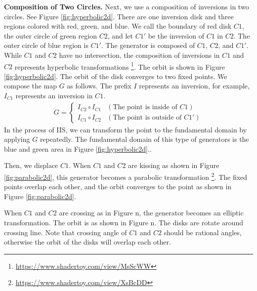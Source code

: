 \noindent\textbf{Composition of Two Circles.}
 Next, we use a composition of inversions in two circles.
 See Figure \ref{fig:hyperbolic2d}.
 There are one inversion disk and three regions colored with red, green,
 and blue.
 We call the boundary of red disk $C1$, 
 the outer circle of green region $C2$, and
 let $C1'$ be the inversion of $C1$ in $C2$.
 The outer circle of blue region is $C1'$.
 The generator is composed of $C1$, $C2$, and $C1'$.
 While $C1$ and $C2$ have no intersection, the composition of inversions
 in $C1$ and $C2$ represents hyperbolic transformations
 \footnote{\url{https://www.shadertoy.com/view/MsScWW}}.
 The orbit is shown in Figure
 \ref{fig:hyperbolic2d}.
 The orbit of the disk converges to two fixed points.
 We compose the map $G$ as follows.
 The prefix $I$ represents an inversion, for example, $I_{C1}$ represents
 an inversion in $C1$.
 \begin{align*}
  G =
  \begin{cases}
   I_{C2} \circ I_{C1} & (\text{The point is inside of } C1) \\
   I_{C1} \circ I_{C2} & (\text{The point is outside of }C1')
  \end{cases}
 \end{align*}
 In the process of IIS, we can transform the point to the fundamental
 domain by applying $G$ repeatedly.
 The fundamental domain of this type of generators is the blue and green
 area in Figure \ref{fig:hyperbolic2d}..

 Then, we displace $C1$.
 When $C1$ and $C2$ are kissing as shown in Figure 
 \ref{fig:parabolic2d},
 this generator becomes a parabolic transformation
 \footnote{\url{https://www.shadertoy.com/view/XsBcDD}}.
 The fixed points overlap each other, and the orbit converges to the
 point as shown in Figure \ref{fig:parabolic2d}.

 When $C1$ and $C2$ are crossing as in Figure n, 
 the generator becomes an elliptic transformation.
 The orbit is as shown in Figure n.
 The disks are rotate around crossing line.
 Note that crossing angle of $C1$ and $C2$ should be rational angles,
 otherwise the orbit of the disks will overlap each other.

